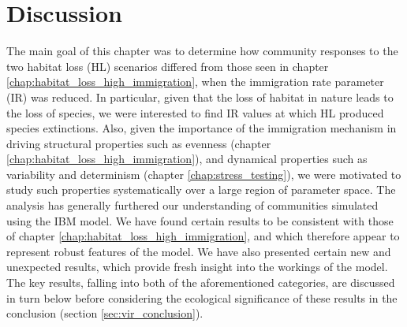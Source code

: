 %

\section{Discussion}
\label{sec:vir_discussion}


The main goal of this chapter was to determine how community responses to the two habitat loss (HL) scenarios differed from those seen in chapter \ref{chap:habitat_loss_high_immigration}, when the immigration rate parameter (IR) was reduced. In particular, given that the loss of habitat in nature leads to the loss of species, we were interested to find IR values at which HL produced species extinctions. Also, given the importance of the immigration mechanism in driving structural properties such as evenness (chapter \ref{chap:habitat_loss_high_immigration}), and dynamical properties such as variability and determinism (chapter \ref{chap:stress_testing}), we were motivated to study such properties systematically over a large region of parameter space. The analysis has generally furthered our understanding of communities simulated using the IBM model. We have found certain results to be consistent with those of chapter \ref{chap:habitat_loss_high_immigration}, and which therefore appear to represent robust features of the model. We have also presented certain new and unexpected results, which provide fresh insight into the workings of the model. The key results, falling into both of the aforementioned categories, are discussed in turn below before considering the ecological significance of these results in the conclusion (section \ref{sec:vir_conclusion}). 

